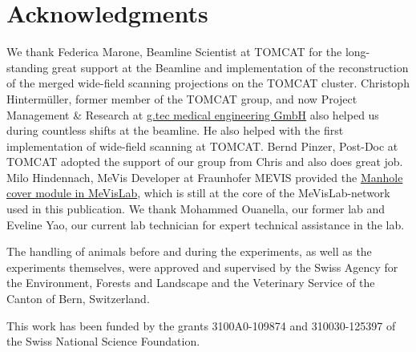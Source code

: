 \documentclass[%
	paper=a4,%
	DIV=calc,%
	twoside=true,%
	abstract=true,%
	]{scrartcl}
\newcommand{\todojcs}[2][]{\todo[color=magenta!62!white, #1]{Johannes: #2}}
\begin{document}
\section{Acknowledgments}
We thank Federica Marone, Beamline Scientist at TOMCAT for the long-standing great support at the Beamline and implementation of the reconstruction of the merged wide-field scanning projections on the TOMCAT cluster. Christoph Hinterm\"{u}ller, former member of the TOMCAT group, and now Project Management \& Research at \href{http://gtec.at/}{g.tec medical engineering GmbH} also helped us during countless shifts at the beamline. He also helped with the first implementation of wide-field scanning at TOMCAT. Bernd Pinzer, Post-Doc at TOMCAT adopted the support of our group from Chris and also does great job. Milo Hindennach, MeVis Developer at Fraunhofer MEVIS provided the \href{http://www.mevis-research.de/cgi-bin/discus/board-auth.cgi?lm=1282233250&file=/839/11760.html}{Manhole cover module in MeVisLab}, which is still at the core of the MeVisLab-network used in this publication. We thank Mohammed Ouanella, our former lab and Eveline Yao, our current lab technician for expert technical assistance in the lab.

The handling of animals before and during the experiments, as well as the experiments themselves, were approved and supervised by the Swiss Agency for the Environment, Forests and Landscape and the Veterinary Service of the Canton of Bern, Switzerland.

This work has been funded by the grants 3100A0-109874 and 310030-125397 \todojcs{Immernoch korrekt?} of the Swiss National Science Foundation.



\end{document}
